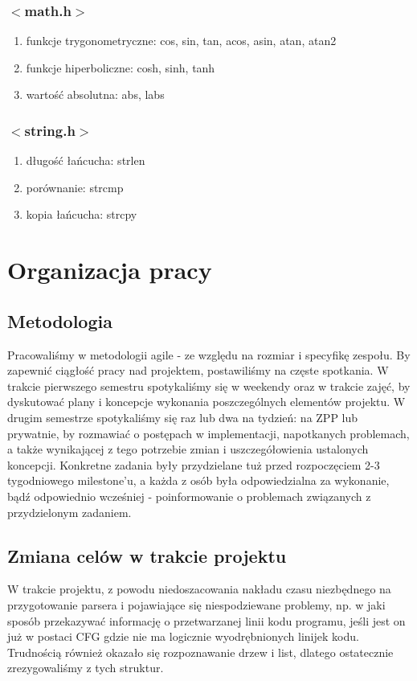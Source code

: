 \documentclass[a4paper,twoside,openright,11pt]{report}
\begin{document}
  \subsection {$<$math.h$>$}
    \begin{enumerate}
      \item funkcje trygonometryczne: cos, sin, tan, acos, asin, atan, atan2
      \item funkcje hiperboliczne: cosh, sinh, tanh
      \item wartość absolutna: abs, labs
    \end{enumerate}
  \subsection {$<$string.h$>$}
    \begin{enumerate}
      \item długość łańcucha: strlen
      \item porównanie: strcmp
      \item kopia łańcucha: strcpy
    \end{enumerate}

  \chapter {Organizacja pracy}

  \section {Metodologia}
\par Pracowaliśmy w metodologii agile - ze względu na rozmiar i specyfikę zespołu. By zapewnić ciągłość pracy nad projektem, postawiliśmy na częste spotkania. W trakcie pierwszego semestru spotykaliśmy się w weekendy oraz w trakcie zajęć, by dyskutować plany i koncepcje wykonania poszczególnych elementów projektu. W drugim semestrze spotykaliśmy się raz lub dwa na tydzień: na ZPP lub prywatnie, by rozmawiać o postępach w implementacji, napotkanych problemach, a także wynikającej z tego potrzebie zmian i uszczegółowienia ustalonych koncepcji. Konkretne zadania były przydzielane tuż przed rozpoczęciem 2-3 tygodniowego milestone’u, a każda z osób była odpowiedzialna za wykonanie, bądź odpowiednio wcześniej - poinformowanie o problemach związanych z przydzielonym zadaniem.

  \section {Zmiana celów w trakcie projektu}
\par W trakcie projektu, z powodu niedoszacowania nakładu czasu niezbędnego na przygotowanie parsera i pojawiające się niespodziewane problemy, np. w jaki sposób przekazywać informację o przetwarzanej linii kodu programu, jeśli jest on już w postaci CFG gdzie nie ma logicznie wyodrębnionych linijek kodu. Trudnością również okazało się rozpoznawanie drzew i list, dlatego ostatecznie zrezygowaliśmy z tych struktur.
\end{document}
